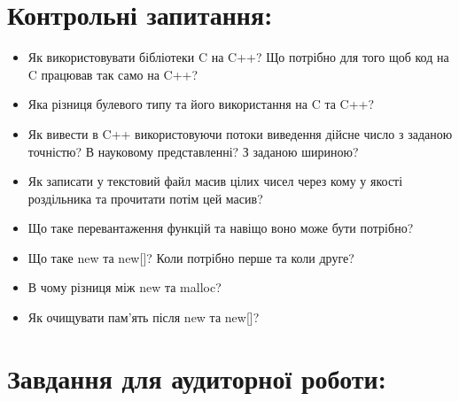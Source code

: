 \documentclass[a5paper,titlepage,openany,twoside,draft]{book_unv}%
\begin{document}
\section{Контрольні запитання:}
\begin{itemize}

\item
  Як використовувати бібліотеки C на C++? Що потрібно для того щоб код
  на C працював так само на C++?
\item
  Яка різниця булевого типу та його використання на C та C++?
\item
  Як вивести в C++ використовуючи потоки виведення дійсне число з
  заданою точністю? В науковому представленні? З заданою шириною?
\item
  Як записати у текстовий файл масив цілих чисел через кому у якості
  роздільника та прочитати потім цей масив?
\item
  Що таке перевантаження функцій та навіщо воно може бути потрібно?
\item
  Що таке new та new{[}{]}? Коли потрібно перше та коли друге?
\item
  В чому різниця між new та malloc?
\item
  Як очищувати пам'ять після new та new{[}{]}?
\end{itemize}

\section{Завдання для аудиторної роботи:}
\end{document}
